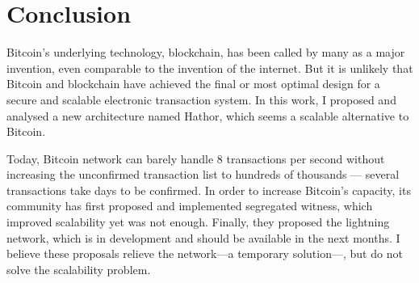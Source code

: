 



\section{Conclusion}

Bitcoin's underlying technology, blockchain, has been called by many as a major invention, even comparable to the invention of the internet. But it is unlikely that Bitcoin and blockchain have achieved the final or most optimal design for a secure and scalable electronic transaction system. In this work, I proposed and analysed a new architecture named Hathor, which seems a scalable alternative to Bitcoin.

Today, Bitcoin network can barely handle 8 transactions per second without increasing the unconfirmed transaction list to hundreds of thousands --- several transactions take days to be confirmed. In order to increase Bitcoin's capacity, its community has first proposed and implemented segregated witness, which improved scalability yet was not enough. Finally, they proposed the lightning network, which is in development and should be available in the next months. I believe these proposals relieve the network---a temporary solution---, but do not solve the scalability problem.

